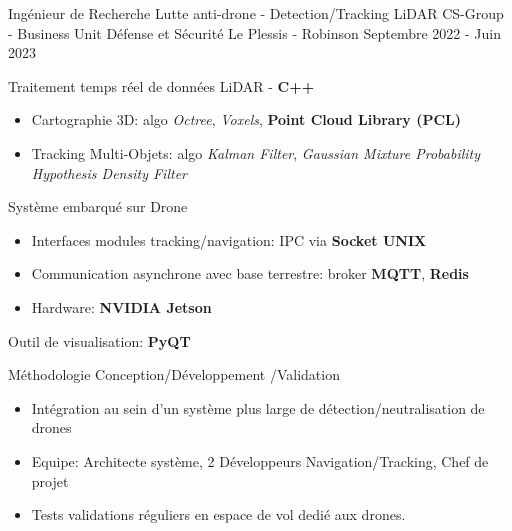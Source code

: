 \begin{cventries}
	\cventry
	{Ingénieur de Recherche}
	{Lutte anti-drone - Detection\slash Tracking LiDAR}
	{CS-Group - Business Unit Défense et Sécurité} %
	{Le Plessis - Robinson} %
	{Septembre 2022 - Juin 2023} %
	{
		\begin{cvitems}
			\item{Traitement temps réel de données LiDAR - \textbf{C++}}
			\begin{itemize}
				\item{Cartographie 3D: algo \textit{Octree}, \textit{Voxels}, \textbf{Point Cloud Library (PCL)}}
				\item{Tracking Multi-Objets: algo \textit{Kalman Filter}, \textit{Gaussian Mixture Probability Hypothesis Density Filter}}
			\end{itemize}
			\item{Système embarqué sur Drone}
			\begin{itemize}
				\item{Interfaces modules tracking\slash navigation: IPC via \textbf{Socket UNIX}}
				\item{Communication asynchrone avec base terrestre: broker \textbf{MQTT}, \textbf{Redis}}
				\item{Hardware: \textbf{NVIDIA Jetson}}
			\end{itemize}
			\item{Outil de visualisation: \textbf{PyQT}}
			\item{Méthodologie Conception\slash Développement \slash Validation}
			\begin{itemize}
				\item{Intégration au sein d'un système plus large de détection\slash neutralisation de drones}
				\item{Equipe: Architecte système, 2 Développeurs Navigation\slash Tracking, Chef de projet}
				\item{Tests validations réguliers en espace de vol dedié aux drones.}
			\end{itemize}
		\end{cvitems}
	}


\end{cventries}
